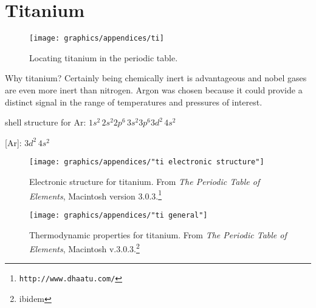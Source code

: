 \section{Titanium}

\begin{figure}[htbp] %
   \centering
   \texttt{[image: graphics/appendices/ti]} 
   \caption[Locating titanium in the periodic table]{Locating titanium in the periodic table.}
   \label{fig:ti:wiki}
\end{figure}

Why titanium? Certainly being chemically inert is advantageous and nobel gases are even more inert than nitrogen. Argon was chosen because it could provide a distinct signal in the range of temperatures and pressures of interest.

%
%

shell structure for Ar: $1s^{2} \, 2s^{2}2p^{6} \, 3s^{2}3p^{6} 3d^{2} \, 4s^{2}$

[Ar]: $3d^{2} \, 4s^{2}$


\begin{figure}[htbp] %
   \centering
   \texttt{[image: graphics/appendices/"ti electronic structure"]} 
   \caption[Electronic structure for titanium]{Electronic structure for titanium. From \emph{The Periodic Table of Elements}, Macintosh version 3.0.3.\footnote{\texttt{http://www.dhaatu.com/}}}
   \label{fig:ti:electronic structure}
\end{figure}

\begin{figure}[htbp] %
   \centering
   \texttt{[image: graphics/appendices/"ti general"]} 
   \caption[Thermodynamic properties for titanium]{Thermodynamic properties for titanium. From \emph{The Periodic Table of Elements}, Macintosh v.3.0.3.\footnote{ibidem}}
   \label{fig:ti:thermodynamic properties}
\end{figure}


\endinput %